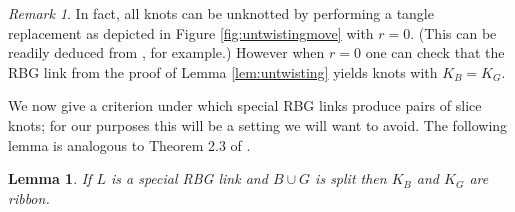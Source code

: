 \documentclass [11pt]{amsart}
\newtheorem {lemma}[theorem]{Lemma}
\theoremstyle{remark}
\newtheorem {remark}[theorem]{Remark}
\begin{document}
\begin{remark}
In fact, all knots can be unknotted by performing a tangle replacement as depicted in Figure \ref{fig:untwistingmove} with $r=0$. (This can be readily deduced from \cite[Lemma 1]{Suz}, for example.)  However when $r=0$ one can check that the RBG link from the proof of Lemma \ref{lem:untwisting} yields knots with $K_B=K_G$. 
\end{remark}
We now give a criterion under which special RBG links produce pairs of slice knots; for our purposes this will be a setting we will want to avoid.  The following lemma is  analogous to Theorem 2.3 of \cite{Pic1}. 


\begin{lemma}\label{lem:splitslice}
If $L$ is a special RBG link and $B\cup G$ is split then $K_B$ and $K_G$ are ribbon.
\end{lemma}
\end{document}
